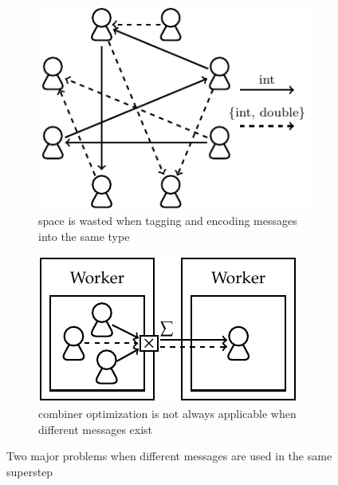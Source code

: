 \documentclass{sokendai_thesis} %
\begin{document}
\begin{figure}[th]
\centering
\begin{subfigure}[b]{0.45\textwidth}
 \includegraphics[width=\textwidth]{figures/multi-msg.pdf}
 \caption{space is wasted when tagging and encoding messages into the same type}
 \label{fig:multi-msg}
\end{subfigure}
\hspace{5pt}
\begin{subfigure}[b]{0.45\textwidth}
 \includegraphics[width=\textwidth]{figures/comb-err.pdf}
 \caption{combiner optimization is not always applicable when different messages exist}
 \label{fig:comb-err}
\end{subfigure}
\caption{Two major problems when different messages are used in the same superstep}
\label{fig:multi-msg-example}
\end{figure}
\end{document}
